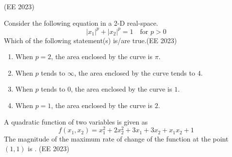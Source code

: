 	\hfill{(EE 2023)}
\item Consider the following equation in a 2-D real-space.
$$
|x_1|^p + |x_2|^p = 1 \quad \text{for } p > 0
$$
Which of the following statement(s) is/are true.\hfill{(EE 2023)}
\begin{enumerate}
    \item When $p=2$, the area enclosed by the curve is $\pi$.
    \item When $p$ tends to $\infty$, the area enclosed by the curve tends to $4$.
    \item When $p$ tends to $0$, the area enclosed by the curve is $1$.
    \item When $p=1$, the area enclosed by the curve is $2$.
\end{enumerate}
\item A quadratic function of two variables is given as
$$
f(x_1, x_2) = x_1^2 + 2x_2^2 + 3x_1 + 3x_2 + x_1 x_2 + 1
$$
The magnitude of the maximum rate of change of the function at the point $(1,1)$ is \underline{\hspace{2.5cm}}. \hfill{(EE 2023)}

